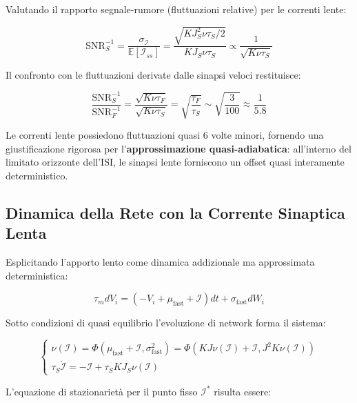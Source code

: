 Valutando il rapporto segnale-rumore (fluttuazioni relative) per le correnti lente:

\begin{equation}
\text{SNR}_{S}^{-1} = \frac{\sigma_{\mathcal{I}}}{\mathbb{E}[\mathcal{I}_{ss}]} = \frac{\sqrt{K J_S^2 \nu \tau_S / 2}}{K J_S \nu \tau_S} \propto \frac{1}{\sqrt{K \nu \tau_S}}
\end{equation}

Il confronto con le fluttuazioni derivate dalle sinapsi veloci restituisce:

\begin{equation}
\frac{\text{SNR}_{S}^{-1}}{\text{SNR}_{F}^{-1}} = \frac{\sqrt{K \nu \tau_F}}{\sqrt{K \nu \tau_S}} = \sqrt{\frac{\tau_F}{\tau_S}} \sim \sqrt{\frac{3}{100}} \approx \frac{1}{5.8}
\end{equation}

Le correnti lente possiedono fluttuazioni quasi 6 volte minori, fornendo una giustificazione rigorosa per l'\textbf{approssimazione quasi-adiabatica}: all'interno del limitato orizzonte dell'ISI, le sinapsi lente forniscono un offset quasi interamente deterministico.

\subsection{Dinamica della Rete con la Corrente Sinaptica Lenta}

Esplicitando l'apporto lento come dinamica addizionale ma approssimata deterministica:

\begin{equation}
\tau_m dV_i = \left(-V_i + \mu_{\text{fast}} + \mathcal{I}\right)dt + \sigma_{\text{fast}} dW_i
\end{equation}

Sotto condizioni di quasi equilibrio l'evoluzione di network forma il sistema:

\begin{equation}
\begin{cases}
\nu(\mathcal{I}) = \Phi(\mu_{\text{fast}} + \mathcal{I}, \sigma_{\text{fast}}^2) = \Phi(K J \nu(\mathcal{I}) + \mathcal{I}, J^2 K \nu(\mathcal{I})) \\
\tau_S \dot{\mathcal{I}} = -\mathcal{I} + \tau_S K J_S \nu(\mathcal{I})
\end{cases}
\end{equation}

L'equazione di stazionarietà per il punto fisso $\mathcal{I}^*$ risulta essere:

